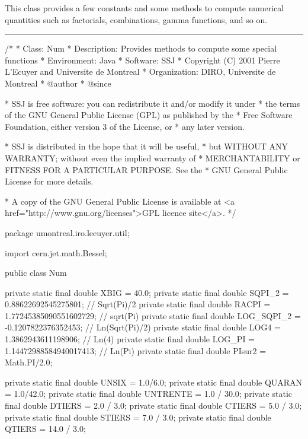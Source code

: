 
This class provides a few constants and some methods to compute numerical
quantities such as factorials, combinations, gamma functions, and so on.

\bigskip\hrule

\begin{code}
\begin{hide}
/*
 * Class:        Num
 * Description:  Provides methods to compute some special functions
 * Environment:  Java
 * Software:     SSJ
 * Copyright (C) 2001  Pierre L'Ecuyer and Universite de Montreal
 * Organization: DIRO, Universite de Montreal
 * @author
 * @since

 * SSJ is free software: you can redistribute it and/or modify it under
 * the terms of the GNU General Public License (GPL) as published by the
 * Free Software Foundation, either version 3 of the License, or
 * any later version.

 * SSJ is distributed in the hope that it will be useful,
 * but WITHOUT ANY WARRANTY; without even the implied warranty of
 * MERCHANTABILITY or FITNESS FOR A PARTICULAR PURPOSE.  See the
 * GNU General Public License for more details.

 * A copy of the GNU General Public License is available at
   <a href="http://www.gnu.org/licenses">GPL licence site</a>.
 */
\end{hide}
package umontreal.iro.lecuyer.util;
\begin{hide} import cern.jet.math.Bessel;\end{hide}

public class Num\begin{hide} {
   private static final double XBIG = 40.0;
   private static final double SQPI_2 = 0.88622692545275801; // Sqrt(Pi)/2
   private static final double RACPI = 1.77245385090551602729; // sqrt(Pi)
   private static final double LOG_SQPI_2 = -0.1207822376352453; // Ln(Sqrt(Pi)/2)
   private static final double LOG4 = 1.3862943611198906;   // Ln(4)
   private static final double LOG_PI = 1.14472988584940017413; // Ln(Pi)
   private static final double PIsur2 = Math.PI/2.0;

   private static final double UNSIX = 1.0/6.0;
   private static final double QUARAN = 1.0/42.0;
   private static final double UNTRENTE = 1.0 / 30.0;
   private static final double DTIERS = 2.0 / 3.0;
   private static final double CTIERS = 5.0 / 3.0;
   private static final double STIERS = 7.0 / 3.0;
   private static final double QTIERS = 14.0 / 3.0;


}
\end{hide}
\end{code}
